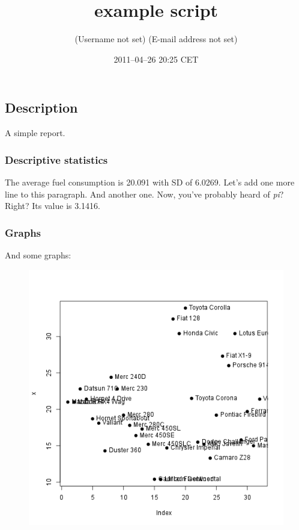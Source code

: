 \documentclass{article}
\title{example script}
\author{(Username not set) (E-mail address not set)}
\date{2011--04--26 20:25 CET}
\makeatletter
\def\maxwidth{\ifdim\Gin@nat@width>\linewidth\linewidth
\else\Gin@nat@width\fi}
\let\Oldincludegraphics\includegraphics
\renewcommand{\includegraphics}[1]{\Oldincludegraphics[width=\maxwidth]{#1}}
\makeatother
\begin{document}
\maketitle

\subsection{Description}

A simple report.

\subsubsection{Descriptive statistics}

The average fuel consumption is 20.091 with SD of 6.0269. Let's add one
more line to this paragraph. And another one. Now, you've probably heard
of \emph{pi}? Right? Its value is 3.1416.

\subsubsection{Graphs}

And some graphs:

\begin{figure}[htbp]
\centering
\includegraphics{0ec1f788fe2feb5d233de865b51e9eaf.png}
\caption{}
\end{figure}
\end{document}
